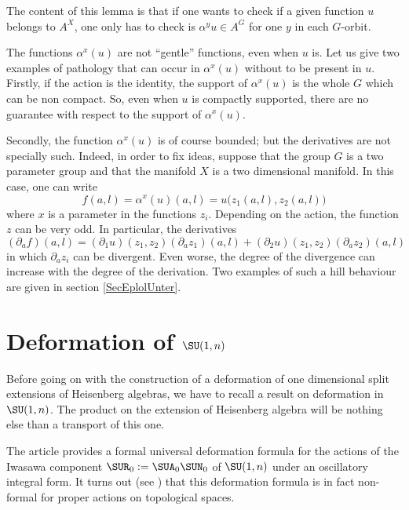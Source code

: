 The content of this lemma is that if one wants to check if a given function $u$ belongs to $A^{X}$, one only has to check is $\alpha^yu\in A^{G}$ for one $y$ in each $G$-orbit.


The functions $\alpha^x(u)$ are not ``gentle'' functions, even when $u$ is. Let us give two examples of pathology that can occur in $\alpha^x(u)$ without to be present in $u$. Firstly,  if the action is the identity, the support of $\alpha^x(u)$ is the whole $G$ which can be non compact. So, even when $u$ is compactly supported, there are no guarantee with respect to the support of $\alpha^x(u)$. 

Secondly, the function $\alpha^x(u)$ is of course bounded; but the derivatives are not specially such. Indeed, in order to fix ideas, suppose that the group $G$ is a two parameter group and that the manifold $X$ is a two dimensional manifold. In this case, one can write
\begin{equation}        \label{EqDefziDefA}
  f(a,l)=\alpha^x(u)(a,l)=u\big( z_1(a,l),z_2(a,l) \big)
\end{equation}
where $x$ is a parameter in the functions $z_i$. Depending on the action, the function $z$ can be very odd. In particular, the derivatives
\[ 
  (\partial_af)(a,l)=(\partial_1u)(z_1,z_2)(\partial_az_1)(a,l)+(\partial_2u)(z_1,z_2)(\partial_az_2)(a,l)
\]
in which $\partial_az_i$ can be divergent. Even worse, the degree of the divergence can increase with the degree of the derivation. Two examples of such a hill behaviour are given in section \ref{SecEplolUnter}. 

\section{Deformation of \texorpdfstring{$\SU(1,n)$}{SU1n}}   \label{SecDefSURme}

Before going on with the construction of a deformation of one dimensional split extensions of Heisenberg algebras, we have to recall a result on deformation in $\SU(1,n)$. The product on the extension of Heisenberg algebra will be nothing else than a transport of this one.

The article \cite{Biel-Massar} provides a formal universal deformation formula for the actions of the Iwasawa component $\SUR_0:=\SUA_0\SUN_0$ of $\SU(1,n)$ under an oscillatory integral form.  It turns out (see \cite{lcBBM}) that this deformation formula is in fact non-formal for proper actions on topological spaces. 

